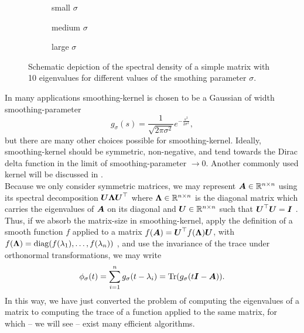 \begin{figure}[ht]
    \begin{subfigure}[b]{0.33\columnwidth}
        
        \caption{small $\sigma$}
        \label{fig:1-introduction-spectral-density-example-0.01}
    \end{subfigure}
    \begin{subfigure}[b]{0.33\columnwidth}
        
        \caption{medium $\sigma$}
        \label{fig:1-introduction-spectral-density-example-0.02}
    \end{subfigure}
    \begin{subfigure}[b]{0.33\columnwidth}
        
        \caption{large $\sigma$}
        \label{fig:1-introduction-spectral-density-example-0.05}
    \end{subfigure}
    \caption{Schematic depiction of the spectral density of a simple matrix with
    10 eigenvalues for different values of the smothing parameter $\sigma$.}
    \label{fig:1-introduction-smoothened-spectral-density}
\end{figure}

In many applications \gls{smoothing-kernel} is chosen to be a Gaussian of width \gls{smoothing-parameter}
\begin{equation}
    g_{\sigma}(s) = \frac{1}{\sqrt{2 \pi \sigma^2}} e^{-\frac{s^2}{2\sigma^2}},
    \label{equ:1-introduction-def-gaussian-kernel}
\end{equation}
but there are many other choices possible for \gls{smoothing-kernel}. Ideally,
\gls{smoothing-kernel} should be symmetric, non-negative, and tend towards the
Dirac delta function in the limit of \gls{smoothing-parameter} $\to 0$. Another
commonly used kernel will be discussed in .\\

Because we only consider symmetric matrices, 
we may represent $\boldsymbol{A} \in \mathbb{R}^{n \times n}$ using its spectral
decomposition $\boldsymbol{U} \boldsymbol{\Lambda} \boldsymbol{U}^{\top}$ where
$\boldsymbol{\Lambda} \in \mathbb{R}^{n \times n}$ is the diagonal matrix which carries
the eigenvalues of $\boldsymbol{A}$ on its diagonal and $\boldsymbol{U} \in \mathbb{R}^{n \times n}$
such that $\boldsymbol{U}^{\top} \boldsymbol{U} = \boldsymbol{I}$ \cite[theorem~4.1.5]{horn1985matrix}.
Thus, if we absorb the \gls{matrix-size} in \gls{smoothing-kernel},
apply the definition of a smooth function $f$ applied to a matrix $f(\boldsymbol{A}) = \boldsymbol{U}^{\top} f(\boldsymbol{\Lambda}) \boldsymbol{U}$,
with $f(\boldsymbol{\Lambda}) = \operatorname{diag}(f(\lambda_1), \dots, f(\lambda_n))$ \cite[definition~1.2]{higham2008functions},
and use the invariance of the trace under orthonormal transformations, we may write
\begin{equation}
    \phi_{\sigma}(t) = \sum_{i=1}^n g_{\sigma}(t - \lambda_i) = \operatorname{Tr}(g_{\sigma}(t\boldsymbol{I} - \boldsymbol{A})).
    \label{equ:1-introduction-spectral-density-as-trace}
\end{equation}
In this way, we have just converted the problem of computing the eigenvalues of
a matrix to computing the trace of a function applied to the same matrix,
for which -- we will see -- exist many efficient algorithms.

